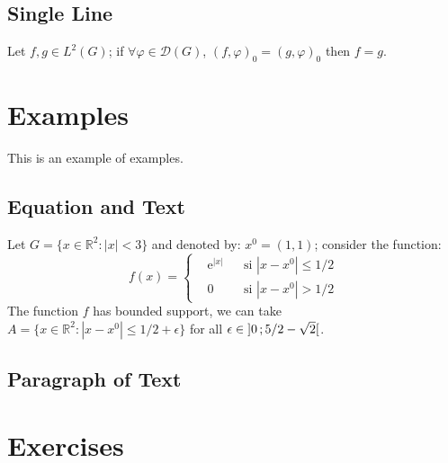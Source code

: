 \documentclass[11pt,fleqn]{book} %
\begin{document}
\subsection{Single Line}

\begin{proposition} 
Let $f,g\in L^2(G)$; if $\forall \varphi\in\mathcal{D}(G)$, $(f,\varphi)_0=(g,\varphi)_0$ then $f = g$. 
\end{proposition}


\section{Examples}

This is an example of examples.

\subsection{Equation and Text}

\begin{example}
Let $G=\{x\in\mathbb{R}^2:|x|<3\}$ and denoted by: $x^0=(1,1)$; consider the function:
\begin{equation}
f(x)=\left\{\begin{aligned} & \mathrm{e}^{|x|} & & \text{si $|x-x^0|\leq 1/2$}\\
& 0 & & \text{si $|x-x^0|> 1/2$}\end{aligned}\right.
\end{equation}
The function $f$ has bounded support, we can take $A=\{x\in\mathbb{R}^2:|x-x^0|\leq 1/2+\epsilon\}$ for all $\epsilon\in\mathopen{]}0\,;5/2-\sqrt{2}\mathclose{[}$.
\end{example}

\subsection{Paragraph of Text}

\begin{example}
\lipsum[2]
\end{example}


\section{Exercises}
\end{document}
